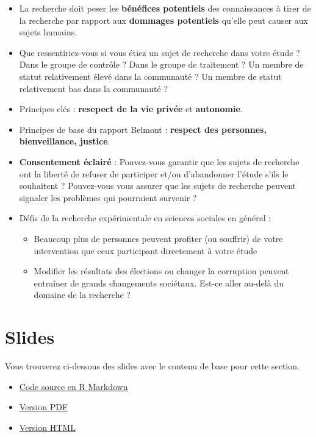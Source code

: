 \documentclass[12pt,]{book}
\begin{document}
\begin{itemize}
\item
  La recherche doit peser les \textbf{bénéfices potentiels} des connaissances à tirer de la recherche par rapport aux \textbf{dommages potentiels} qu'elle peut causer aux sujets humains.
\item
  Que ressentiriez-vous si vous étiez un sujet de recherche dans votre étude ? Dans le groupe de contrôle ? Dans le groupe de traitement ? Un membre de statut relativement élevé dans la communauté ? Un membre de statut relativement bas dans la communauté ?
\item
  Principes clés : \textbf{resepect de la vie privée} et \textbf{autonomie}.
\item
  Principes de base du rapport Belmont : \textbf{respect des personnes, bienveillance, justice}.
\item
  \textbf{Consentement éclairé} : Pouvez-vous garantir que les sujets de recherche ont la liberté de refuser de participer et/ou d'abandonner l'étude s'ils le souhaitent ? Pouvez-vous vous assurer que les sujets de recherche peuvent signaler les problèmes qui pourraient survenir ?
\item
  Défis de la recherche expérimentale en sciences sociales en général :

  \begin{itemize}
  \item
    Beaucoup plus de personnes peuvent profiter (ou souffrir) de votre intervention que ceux participant directement à votre étude
  \item
    Modifier les résultats des élections ou changer la corruption peuvent entraîner de grands changements sociétaux. Est-ce aller au-delà du domaine de la recherche ?
  \end{itemize}
\end{itemize}

\hypertarget{slides-8}{%
\section{Slides}\label{slides-8}}

Vous trouverez ci-dessous des slides avec le contenu de base pour cette section.

\begin{itemize}
\item
  \href{https://egap.github.io/learningdays-resources/Slides_fr/ethics-slides.Rmd}{Code source en R Markdown}
\item
  \href{https://egap.github.io/learningdays-resources/Slides_fr/ethics-slides.pdf}{Version PDF}
\item
  \href{https://egap.github.io/learningdays-resources/Slides_fr/ethics-slides.html}{Version HTML}
\end{itemize}
\end{document}
